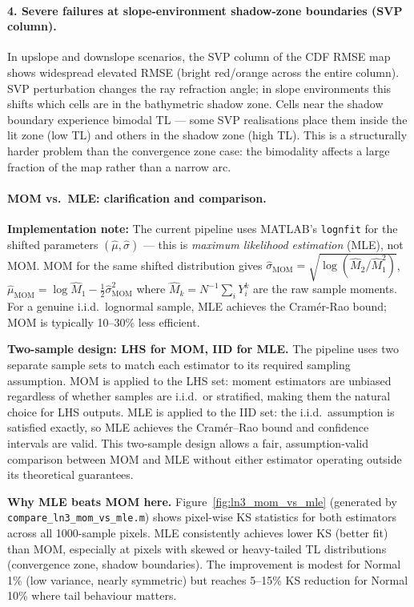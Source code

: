 \documentclass[11pt,a4paper]{article}
\begin{document}
\paragraph{4. Severe failures at slope-environment shadow-zone boundaries (SVP column).}
In upslope and downslope scenarios, the SVP column of the CDF RMSE map shows
widespread elevated RMSE (bright red/orange across the entire column).
SVP perturbation changes the ray refraction angle; in slope environments this shifts
which cells are in the bathymetric shadow zone.
Cells near the shadow boundary experience bimodal TL --- some SVP realisations place them
inside the lit zone (low TL) and others in the shadow zone (high TL).
This is a structurally harder problem than the convergence zone case: the bimodality
affects a large fraction of the map rather than a narrow arc.

\paragraph{MOM vs.\ MLE: clarification and comparison.}
\textbf{Implementation note:} The current pipeline uses MATLAB's \texttt{lognfit}
for the shifted parameters $(\hat\mu, \hat\sigma)$ --- this is
\emph{maximum likelihood estimation} (MLE), not MOM.
MOM for the same shifted distribution gives
$\hat\sigma_{\mathrm{MOM}} = \sqrt{\log(\hat{M}_2/\hat{M}_1^2)}$,
$\hat\mu_{\mathrm{MOM}} = \log \hat{M}_1 - \tfrac{1}{2}\hat\sigma_{\mathrm{MOM}}^2$
where $\hat{M}_k = N^{-1}\sum_i Y_i^k$ are the raw sample moments.
For a genuine i.i.d.\ lognormal sample, MLE achieves the Cram\'er-Rao bound;
MOM is typically 10--30\% less efficient.

\textbf{Two-sample design: LHS for MOM, IID for MLE.}
The pipeline uses two separate sample sets to match each estimator to its required
sampling assumption.
MOM is applied to the LHS set: moment estimators are unbiased regardless of whether
samples are i.i.d.\ or stratified, making them the natural choice for LHS outputs.
MLE is applied to the IID set: the i.i.d.\ assumption is satisfied exactly, so MLE
achieves the Cram\'er--Rao bound and confidence intervals are valid.
This two-sample design allows a fair, assumption-valid comparison between MOM and MLE
without either estimator operating outside its theoretical guarantees.

\textbf{Why MLE beats MOM here.}
Figure~\ref{fig:ln3_mom_vs_mle} (generated by \texttt{compare\_ln3\_mom\_vs\_mle.m})
shows pixel-wise KS statistics for both estimators across all 1000-sample pixels.
MLE consistently achieves lower KS (better fit) than MOM, especially at pixels with
skewed or heavy-tailed TL distributions (convergence zone, shadow boundaries).
The improvement is modest for Normal\,1\% (low variance, nearly symmetric) but
reaches 5--15\% KS reduction for Normal\,10\% where tail behaviour matters.
\end{document}
